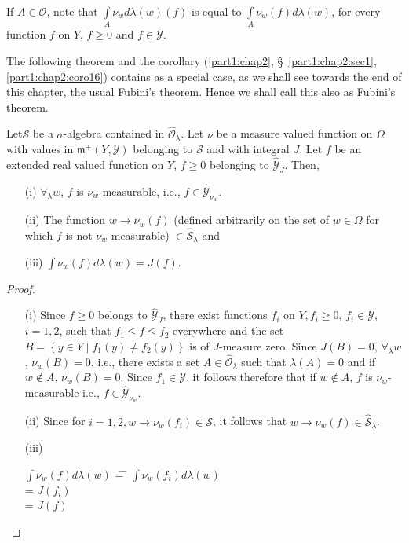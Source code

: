 If $A \in \mathscr{O}$, note that $\int\limits_A \nu_wd \lambda (w)
(f)$  is equal to $\int\limits_A \nu_w (f) d \lambda(w)$, for every
function $f$ on $Y$, $f\geq 0$ and $f \in \mathscr{Y}$. 

The following theorem and the corollary (\ref{part1:chap2},
\S\ \ref{part1:chap2:sec1}, \ref{part1:chap2:coro16}) contains as a
special case, as we shall see towards the end of this chapter, the
usual Fubini's theorem. Hence we shall call this also as Fubini's
theorem. 

\begin{thm}[Fubini]\label{part1:chap2:thm15}
Let\pageoriginale  $\mathcal{S}$ be a $\sigma$-algebra contained in
$\hat{\mathscr{O}}_\lambda$. Let $\nu$ be a measure valued function on
$\Omega$ with values in $\mathfrak{m}^+ (Y, \mathscr{Y})$ belonging to
$\mathcal{S}$ and with integral $J$. Let $f$ be an extended real
valued function on $Y$, $f \geq 0$ belonging to
$\hat{\mathscr{Y}}_J$. Then, 
\begin{itemize}
\item[{\rm (i)}] $\forall_\lambda w$, $f$ is $\nu_w$-measurable, i.e.,
   $f \in \hat{\mathscr{Y}}_{\nu_w}$. 

\item[{\rm (ii)}] The function $w \to \nu_w (f)$ (defined arbitrarily
  on the set of $w \in\Omega$ for which $f$ is not $\nu_w$-measurable)
  $\in \hat{\mathcal{S}}_\lambda$ and 

\item[{\rm (iii)}] \qquad $\int\nu_w (f) d \lambda (w) = J(f)$. 
\end{itemize}
\end{thm}

\begin{proof}
\begin{itemize}
\item[{\rm (i)}] Since $f \geq 0$ belongs to $\hat{\mathscr{Y}}_J$,
  there exist functions $f_i$ on $Y, f_i \geq 0$, $f_i \in
  \mathscr{Y}$, $i=1,2$, such that $f_1 \leq f \leq f_2$ everywhere
  and the set $B = \left\{  y \in Y \mid f_1 (y) \neq f_2(y) \right\}$
  is of $J$-measure zero. Since $J(B) = 0$, $\forall_\lambda w$,
  $\nu_w (B)  =0$. i.e., there exists a set $A \in
  \hat{\mathscr{O}}_\lambda$ such that $\lambda(A) = 0$ and if $w
  \not\in A$, $\nu_w (B) = 0$. Since $f_1 \in\mathscr{Y}$, it follows
  therefore that if $w \not\in A$, $f $ is  $\nu_w$-measurable i.e.,
  $f \in \hat{\mathscr{Y}}_{\nu_w}$. 

\item[{\rm (ii)}] Since for $i = 1,2, w \to \nu_w (f_i) \in
  \mathcal{S}$, it follows that $w \to \nu_w (f) \in
  \hat{\mathcal{S}}_\lambda$. 

\item[{\rm (iii)}] 
\begin{tabbing}
$\int \nu_w (f) d \lambda (w)$ \= = \= $\int \nu_w(f_i) d\lambda(w)$\\
\> = \> $J(f_i)$\\
\> = \> $J(f)$
\end{tabbing}
\end{itemize}
\end{proof}

